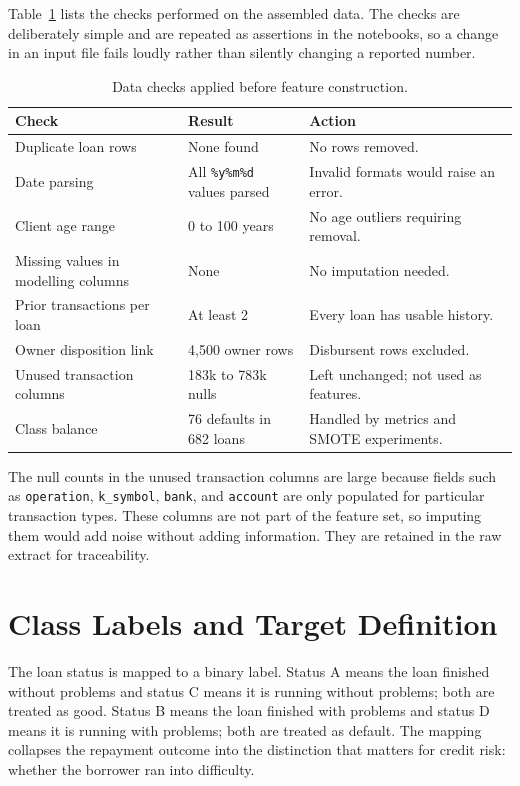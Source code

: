 Table~\ref{tab:cleaning-checks} lists the checks performed on the assembled data. The checks are deliberately simple and are repeated as assertions in the notebooks, so a change in an input file fails loudly rather than silently changing a reported number.

\begin{table}[H]
    \centering
    \caption{Data checks applied before feature construction.}
    \label{tab:cleaning-checks}
    \begin{tabularx}{\textwidth}{@{}lXl@{}}
        \toprule
        \textbf{Check} & \textbf{Result} & \textbf{Action} \\
        \midrule
        Duplicate loan rows & None found & No rows removed. \\
        Date parsing & All \texttt{\%y\%m\%d} values parsed & Invalid formats would raise an error. \\
        Client age range & 0 to 100 years & No age outliers requiring removal. \\
        Missing values in modelling columns & None & No imputation needed. \\
        Prior transactions per loan & At least 2 & Every loan has usable history. \\
        Owner disposition link & 4,500 owner rows & Disbursent rows excluded. \\
        Unused transaction columns & 183k to 783k nulls & Left unchanged; not used as features. \\
        Class balance & 76 defaults in 682 loans & Handled by metrics and SMOTE experiments. \\
        \bottomrule
    \end{tabularx}
\end{table}

The null counts in the unused transaction columns are large because fields such as \texttt{operation}, \texttt{k\_symbol}, \texttt{bank}, and \texttt{account} are only populated for particular transaction types. These columns are not part of the feature set, so imputing them would add noise without adding information. They are retained in the raw extract for traceability.

\section{Class Labels and Target Definition}
\label{sec:target-definition}

The loan status is mapped to a binary label. Status A means the loan finished without problems and status C means it is running without problems; both are treated as good. Status B means the loan finished with problems and status D means it is running with problems; both are treated as default. The mapping collapses the repayment outcome into the distinction that matters for credit risk: whether the borrower ran into difficulty.

